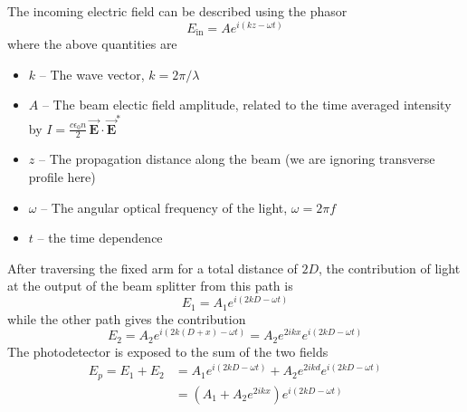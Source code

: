 \documentclass[8pt,a4paper]{article}
\begin{document}
	The incoming electric field can be described using the phasor
	\begin{equation}
		E_\mathrm{in} = A e^{i(kz - \omega t)}
	\end{equation}
	where the above quantities are
	\begin{itemize}
		\item $k$ -- The wave vector, $k=2\pi/\lambda$
		\item $A$ -- The beam electic field amplitude, related to the time averaged intensity by $I = \frac{c\epsilon_0 n}{2} \, \vec{\mathbf{E}} \cdot \vec{\mathbf{E}}^*$
		\item $z$ -- The propagation distance along the beam (we are ignoring transverse profile here)
		\item $\omega$ -- The angular optical frequency of the light, $\omega = 2\pi f$
		\item $t$ -- the time dependence
	\end{itemize}
	
	After traversing the fixed arm for a total distance of $2D$, the contribution of light at the output of the beam splitter from this path is
	\begin{equation}
		E_1 = A_1 e^{i(2kD - \omega t)}
	\end{equation}
	while the other path gives the contribution
	\begin{equation}
		E_2 = A_2 e^{i(2k(D+x) - \omega t)} = A_2 e^{2ikx}e^{i(2kD - \omega t)}
	\end{equation}
	The photodetector is exposed to the sum of the two fields
	\begin{align}
		E_p = E_1 + E_2 &= A_1 e^{i(2kD - \omega t)} + A_2 e^{2ikd}e^{i(2kD - \omega t)} \nonumber\\
		&= \left(A_1 + A_2 e^{2ikx}\right)e^{i(2kD - \omega t)}
	\end{align}
	
\end{document}
